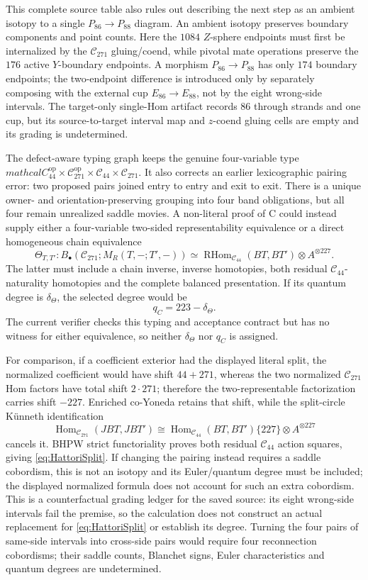 \documentclass[11pt]{amsart}
\theoremstyle{definition}
\theoremstyle{remark}
\begin{document}
This complete source table also rules out describing the next step as an
ambient isotopy to a single $P_{86}\to P_{88}$ diagram.  An ambient isotopy
preserves boundary components and point counts.  Here the $1084$ $Z$-sphere
endpoints must first be internalized by the $\mathcal C_{271}$ gluing/coend,
while pivotal mate operations preserve the $176$ active $Y$-boundary
endpoints.  A morphism $P_{86}\to P_{88}$ has only $174$ boundary endpoints;
the two-endpoint difference is introduced only by separately composing with
the external cup $E_{86}\to E_{88}$, not by the eight wrong-side intervals.
The target-only single-Hom artifact records 86 through strands and one cup,
but its source-to-target interval map and $z$-coend gluing cells are empty and
its grading is undetermined.

The defect-aware typing graph keeps the genuine four-variable type
\(mathcal C_{44}^{\mathrm{op}}\times\mathcal C_{271}^{\mathrm{op}}
\times\mathcal C_{44}\times\mathcal C_{271}\).  It also corrects an earlier
lexicographic pairing error: two proposed pairs joined entry to entry and exit
to exit.  There is a unique owner- and orientation-preserving grouping into
four band obligations, but all four remain unrealized saddle movies.  A
non-literal proof of C could instead supply either a four-variable two-sided
representability equivalence or a direct homogeneous chain equivalence
\[
\Theta_{T,T'}:
B_\bullet(\mathcal C_{271};M_R(T,-;T',-))
\simeq
\operatorname{RHom}_{\mathcal C_{44}}(BT,BT')\otimes A^{\otimes227}.
\]
The latter must include a chain inverse, inverse homotopies, both residual
\(\mathcal C_{44}\)-naturality homotopies and the complete balanced
presentation.  If its quantum degree is \(\delta_\Theta\), the selected
degree would be
\[
q_C=223-\delta_\Theta.
\]
The current verifier checks this typing and acceptance contract but has no
witness for either equivalence, so neither \(\delta_\Theta\) nor \(q_C\) is
assigned.

For comparison, if a coefficient exterior had the displayed literal split,
the normalized coefficient would have shift $44+271$, whereas the two
normalized $\mathcal C_{271}$ Hom factors have total shift $2\cdot271$;
therefore the two-representable factorization carries shift $-227$.
Enriched co-Yoneda retains that shift, while the split-circle K\"unneth
identification
\[
\operatorname{Hom}_{\mathcal C_{271}}(JBT,JBT')
\cong\operatorname{Hom}_{\mathcal C_{44}}(BT,BT')\{227\}
\otimes A^{\otimes227}
\]
cancels it.  BHPW strict functoriality proves both residual
$\mathcal C_{44}$ action squares, giving \eqref{eq:HattoriSplit}.  If changing the pairing instead requires a saddle
cobordism, this is not an isotopy and its Euler/quantum degree must be included;
the displayed normalized formula does not account for such an extra
cobordism.  This is a counterfactual grading ledger for the saved source: its
eight wrong-side intervals fail the premise, so the calculation does not
construct an actual replacement for \eqref{eq:HattoriSplit} or establish its
degree.  Turning the four pairs of same-side intervals into cross-side pairs
would require four reconnection cobordisms; their saddle counts, Blanchet
signs, Euler characteristics and quantum degrees are undetermined.
\end{document}
